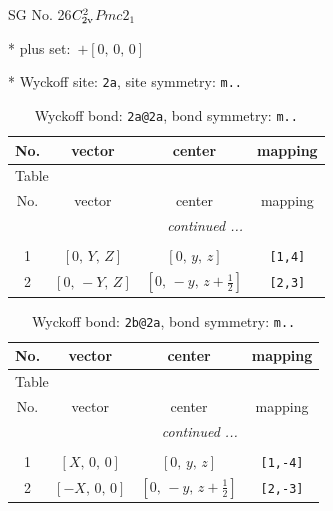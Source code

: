 \documentclass[fleqn,8pt]{jsarticle}
\begin{document}
\setcounter{MaxMatrixCols}{32}

\renewcommand{\tablename}{Table~}
\renewcommand{\figurename}{Figure~}
\begin{center}
\LARGE
SG No. 26\quad$C_{\rm 2v}^{2}$\quad$Pmc2_1$\quad[ orthorhombic ]
\end{center}

* plus set:\,\,\,$+\left[ 0,\, 0,\, 0 \right]$


* Wyckoff site: {\tt 2a}, site symmetry: {\tt m..}
\renewcommand{\arraystretch}{1.2}
\begin{longtable}{cccc}
\caption{Wyckoff bond: {\tt 2a@2a}, bond symmetry: {\tt m..}}
 \\
 \hline \hline
No. & vector & center & mapping \\ \hline \endfirsthead

\multicolumn{3}{l}{\tablename\ \thetable{}} \\
 \hline \hline
No. & vector & center & mapping \\ \hline \endhead

 \hline \hline
\multicolumn{3}{r}{\footnotesize\it continued ...} \\ \endfoot

 \hline \hline
\multicolumn{3}{r}{} \\ \endlastfoot

1 & $\left[ 0,\, Y,\, Z \right]$ & $\left[ 0,\, y,\, z \right]$ & {\tt [1,4]} \\ \hline
2 & $\left[ 0,\, - Y,\, Z \right]$ & $\left[ 0,\, - y,\, z + \frac{1}{2} \right]$ & {\tt [2,3]} \\
\end{longtable}
\renewcommand{\arraystretch}{1.2}
\begin{longtable}{cccc}
\caption{Wyckoff bond: {\tt 2b@2a}, bond symmetry: {\tt m..}}
 \\
 \hline \hline
No. & vector & center & mapping \\ \hline \endfirsthead

\multicolumn{3}{l}{\tablename\ \thetable{}} \\
 \hline \hline
No. & vector & center & mapping \\ \hline \endhead

 \hline \hline
\multicolumn{3}{r}{\footnotesize\it continued ...} \\ \endfoot

 \hline \hline
\multicolumn{3}{r}{} \\ \endlastfoot

1 & $\left[ X,\, 0,\, 0 \right]$ & $\left[ 0,\, y,\, z \right]$ & {\tt [1,-4]} \\ \hline
2 & $\left[ - X,\, 0,\, 0 \right]$ & $\left[ 0,\, - y,\, z + \frac{1}{2} \right]$ & {\tt [2,-3]} \\
\end{longtable}
\end{document}

